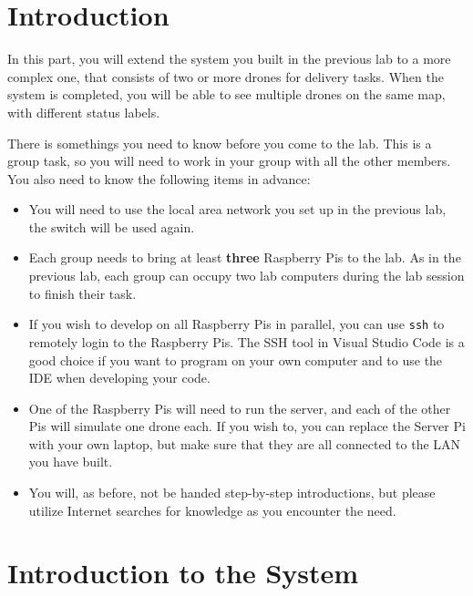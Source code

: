 \documentclass{article}
\begin{document}
\section{Introduction}
In this part, you will extend the system you built in the previous lab to a more complex one, that consists of two or more drones for delivery tasks. When the system is completed, you will be able to see multiple drones on the same map, with different status labels.

There is somethings you need to know before you come to the lab. This is a group task, so you will need to work in your group with all the other members. You also need to know the following items in advance:
\begin{itemize}
    \item  You will need to use the local area network you set up in the previous lab, the switch will be used again.
    \item Each group needs to bring at least {\bf three} Raspberry Pis to the lab. As in the previous lab, each group can occupy two lab computers during the lab session to finish their task.
    \item If you wish to develop on all Raspberry Pis in parallel, you can use \verb!ssh! to remotely login to the Raspberry Pis. The SSH tool in Visual Studio Code is a good choice if you want to program on your own computer and to use the IDE when developing your code.
    \item One of the Raspberry Pis will need to run the server, and each of the other Pis will simulate one drone each. If you wish to, you can replace the Server Pi with your own laptop, but make sure that they are all connected to the LAN you have built.
    \item You will, as before, not be handed step-by-step introductions, but please utilize Internet searches for knowledge as you encounter the need.
\end{itemize}

\section{Introduction to the System}
\end{document}
